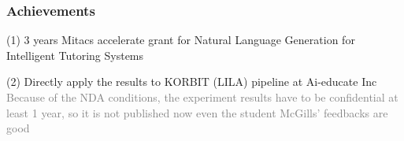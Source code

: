 \documentclass{beamer}
\begin{document}
\begin{frame}
\frametitle{Achievements}
(1) 3 years Mitacs accelerate grant for Natural Language Generation for Intelligent Tutoring Systems \\
\begin{center}
	
\end{center}
(2) Directly apply the results to KORBIT (LILA) pipeline  at Ai-educate Inc \\
 \textcolor{gray}{Because of the NDA conditions, the experiment results have to be confidential at least 1 year, so it is not published now even the student McGills' feedbacks are good}



\end{frame}

\end{document}
